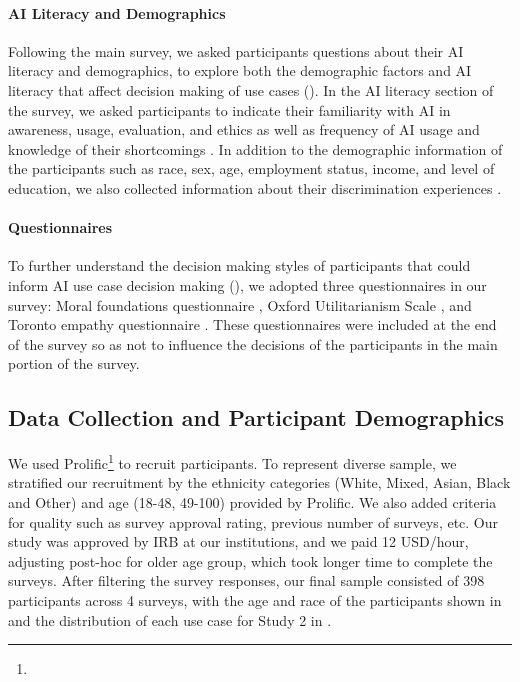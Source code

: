 \paragraph{AI Literacy and Demographics}
Following the main survey, we asked participants questions about their AI literacy and demographics, to explore both the demographic factors and AI literacy that affect decision making of use cases (\demofactor). In the AI literacy section of the survey, we asked participants to indicate their familiarity with AI in awareness, usage, evaluation, and ethics as well as frequency of AI usage and knowledge of their shortcomings \citep{wang2023measuring,mun2024participaidemocraticsurveyingframework}. In addition to the demographic information of the participants such as race, sex, age, employment status, income, and level of education, we also collected information about their discrimination experiences \citep{kingsley2024investigating}. 

\paragraph{Questionnaires}
To further understand the decision making styles of participants that could inform AI use case decision making (\reasoningfactor), we adopted three questionnaires in our survey: Moral foundations questionnaire \citep{graham2008moral}, Oxford Utilitarianism Scale \citep{kahane2018beyond}, and Toronto empathy questionnaire \citep{spreng2009toronto}. These questionnaires were included at the end of the survey so as not to influence the decisions of the participants in the main portion of the survey. 

\subsection{Data Collection and Participant Demographics}
\label{ssec:data-and-demographics}
We used Prolific\footnote{} to recruit participants. To represent diverse sample, we stratified our recruitment by the ethnicity categories (White, Mixed, Asian, Black and Other) and age (18-48, 49-100) provided by Prolific. We also added criteria for quality such as survey approval rating, previous number of surveys, etc. Our study was approved by IRB at our institutions, and we paid 12 USD/hour, adjusting post-hoc for older age group, which took longer time to complete the surveys. After filtering the survey responses, our final sample consisted of 398 participants across 4 surveys, with the age and race of the participants shown in  and the distribution of each use case for Study 2 in .